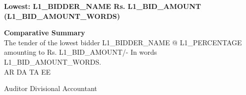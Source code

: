 \documentclass[a4paper,landscape]{article}
\begin{document}
\vspace{0.5cm}
\begin{center}
    \textbf{Lowest: {L1_BIDDER_NAME}  \quad Rs. {L1_BID_AMOUNT} ({L1_BID_AMOUNT_WORDS})}
\end{center}

\begin{flushleft}
    \parbox{0.6\textwidth}{
        \textbf{Comparative Summary} \\
        The tender of the lowest bidder {L1_BIDDER_NAME} @ {L1_PERCENTAGE} amounting to Rs. {L1_BID_AMOUNT}/- In words {L1_BID_AMOUNT_WORDS}. \\
        \vspace{0.2cm}
        \hspace{1cm} AR \hfill DA \hfill TA \hfill EE
    }
\end{flushleft}

\begin{flushleft}
    Auditor \hfill Divisional Accountant
\end{flushleft}
\end{document}
